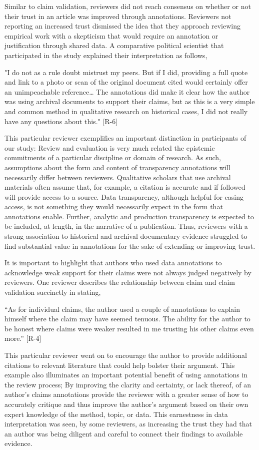 \documentclass[sigchi]{acmart}
\begin{document}
Similar to claim validation, reviewers did not reach consensus on whether or not their trust in an article was improved through annotations. Reviewers not reporting an increased trust dismissed the idea that they approach reviewing empirical work with a skepticism that would require an annotation or justification through shared data. A comparative political scientist that participated in the study explained their interpretation as follows, \begin{displayquote}
"I do not as a rule doubt mistrust my peers. But if I did, providing a full quote and link to a photo or scan of the original document cited would certainly offer an unimpeachable reference… The annotations did make it clear how the author was using archival documents to support their claims, but as this is a very simple and common method in qualitative research on historical cases, I did not really have any questions about this." [R-6] 
\end{displayquote}
This particular reviewer exemplifies an important distinction in participants of our study: Review and evaluation is very much related the epistemic commitments of a particular discipline or domain of research. As such, assumptions about the form and content of transparency annotations will necessarily differ between reviewers. Qualitative scholars that use archival materials often assume that, for example, a citation is accurate and if followed will provide access to a source. Data transparency, although helpful for easing access, is not something they would necessarily expect in the form that annotations enable. Further, analytic and production transparency is expected to be included, at length, in the narrative of a publication. Thus, reviewers with a strong association to historical and archival documentary evidence struggled to find substantial value in annotations for the sake of extending or improving trust. 

It is important to highlight that authors who used data annotations to acknowledge weak support for their claims were not always judged negatively by reviewers. One reviewer describes the relationship between claim and claim validation succinctly in stating, \begin{displayquote}
“As for individual claims, the author used a couple of annotations to explain himself where the claim may have seemed tenuous. The ability for the author to be honest where claims were weaker resulted in me trusting his other claims even more.” [R-4] 
\end{displayquote}
This particular reviewer went on to encourage the author to provide additional citations to relevant literature that could help bolster their argument. This example also illuminates an important potential benefit of using annotations in the review process; By improving the clarity and certainty, or lack thereof, of an author's claims annotations provide the reviewer with a greater sense of how to accurately critique and thus improve the author's argument based on their own expert knowledge of the method, topic, or data. This earnestness in data interpretation was seen, by some reviewers, as increasing the trust they had that an author was being diligent and careful to connect their findings to available evidence.  
\end{document}
